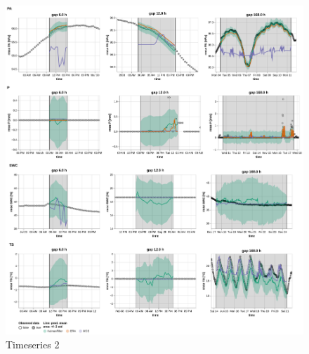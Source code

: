 \documentclass{article}
\newcommand{\imgwidth}{6in}
\begin{document}
\begin{figure}
\centerline{\includegraphics[width=\imgwidth]{timeseries_2}}
\caption{Timeseries 2}
\label{fig:ts_1_1}
\end{figure}




\end{document}
